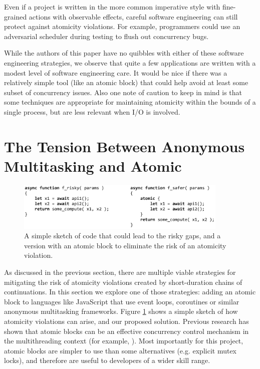 \documentclass[acmsmall,anonymous,review]{acmart}\settopmatter{printfolios=true,printccs=false,printacmref=false}
\begin{document}
Even if a project is written in the more common imperative style with fine-grained actions with observable effects, careful software engineering can still protect against atomicity violations.
For example, programmers could use an adversarial scheduler during testing to flush out concurrency bugs.

While the authors of this paper have no quibbles with either of these software engineering strategies, we observe that quite a few applications are written with a modest level of software engineering care.
It would be nice if there was a relatively simple tool (like an atomic block) that could help avoid at least some subset of concurrency issues.
Also one note of caution to keep in mind is that some techniques are appropriate for maintaining atomicity within the bounds of a single process, but are less relevant when I/O is involved.

\section{The Tension Between Anonymous Multitasking and Atomic}

\begin{figure}
\includegraphics[width=0.9\textwidth]{Code/async_atomic_js}
\caption{A simple sketch of code that could lead to the risky gaps, and a version with an atomic block to eliminate the risk of an atomicity violation.}
\label{fig:async_atomic_js}
\end{figure}

As discussed in the previous section, there are multiple viable strategies for mitigating the risk of atomicity violations created by short-duration chains of continuations.
In this section we explore one of those strategies: adding an atomic block to languages like JavaScript that use event loops, coroutines or similar anonymous multitasking frameworks.
Figure \ref{fig:async_atomic_js} shows a simple sketch of how atomicity violations can arise, and our proposed solution.
Previous research has shown that atomic blocks can be an effective concurrency control mechanism in the multithreading context (for example, \cite{Pankratius2011, Pankratius2014}).
Most importantly for this project, atomic blocks are simpler to use than some alternatives (e.g. explicit mutex locks), and therefore are useful to developers of a wider skill range\footnotemark{}.
\end{document}
